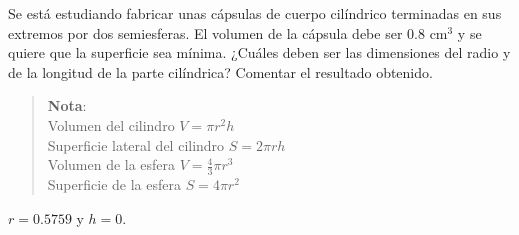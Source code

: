 {Se está estudiando fabricar unas cápsulas de cuerpo cilíndrico terminadas en sus extremos por dos semiesferas. El volumen de la cápsula debe ser $0.8$ cm$^3$ y se quiere que la superficie sea mínima. ¿Cuáles deben ser las dimensiones del radio y de la longitud de la parte cilíndrica? Comentar el resultado obtenido.
\begin{quote}
    \textbf{Nota}:\\
    Volumen del cilindro $V=\pi r^2 h$\\
    Superficie lateral del cilindro $S=2\pi r h$\\
    Volumen de la esfera $V= \frac{4}{3}\pi r^3$\\
    Superficie de la esfera $S=4\pi r^2$\\
\end{quote}
}
{$r = 0.5759$ y $h=0$.
}
